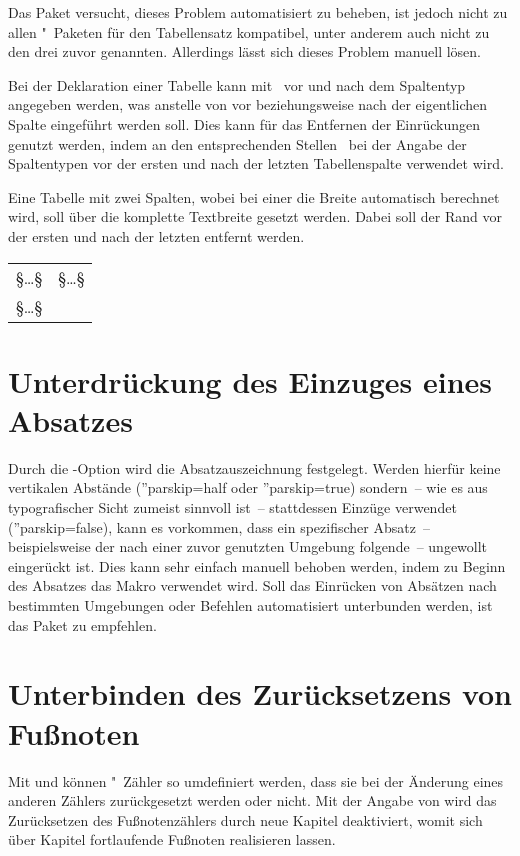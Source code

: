 Das Paket  versucht, dieses Problem automatisiert zu 
beheben, ist jedoch nicht zu allen "~Paketen für den 
Tabellensatz kompatibel, unter anderem auch nicht zu den drei zuvor genannten. 
Allerdings lässt sich dieses Problem manuell lösen. 

Bei der Deklaration einer Tabelle kann mit~\MPValue{\dots} vor und 
nach dem Spaltentyp angegeben werden, was anstelle von  vor 
beziehungsweise nach der eigentlichen Spalte eingeführt werden soll. Dies kann 
für das Entfernen der Einrückungen genutzt werden, indem an den entsprechenden 
Stellen~ bei der Angabe der Spaltentypen vor der ersten und 
nach der letzten Tabellenspalte verwendet wird.
%
\begin{Example}
Eine Tabelle mit zwei Spalten, wobei bei einer die Breite automatisch berechnet 
wird, soll über die komplette Textbreite gesetzt werden. Dabei soll der Rand 
vor der ersten und nach der letzten entfernt werden.
\begin{Code}[escapechar=§]
\begin{tabularx}{\textwidth}{@{}lX@{}}
§\dots§ & §\dots§ \tabularnewline
§\dots§
\end{tabularx}
\end{Code}
\end{Example}



\section{%
  Unterdrückung des Einzuges eines Absatzes%
}
%
Durch die \KOMAScript-Option  wird
die Absatzauszeichnung  festgelegt. Werden hierfür keine vertikalen Abstände 
(\Option''{parskip=half} oder \Option''{parskip=true}) sondern~-- wie es aus 
typografischer Sicht zumeist sinnvoll ist~-- stattdessen Einzüge verwendet 
(\Option''{parskip=false}), kann es vorkommen, dass ein spezifischer Absatz~-- 
beispielsweise der nach einer zuvor genutzten Umgebung folgende~-- ungewollt 
eingerückt ist. Dies kann sehr einfach manuell behoben werden, indem zu Beginn 
des Absatzes das Makro  verwendet wird. Soll das Einrücken von 
Absätzen nach bestimmten Umgebungen oder Befehlen automatisiert unterbunden 
werden, ist das Paket  zu empfehlen.



\section{%
  Unterbinden des Zurücksetzens von Fußnoten%
  \label{sec:tips:counter}%
}
%
Mit  und  können 
"~Zähler so umdefiniert werden, dass sie bei der Änderung eines 
anderen Zählers zurückgesetzt werden oder nicht. Mit der Angabe von 
 wird das 
Zurücksetzen des Fußnotenzählers durch neue Kapitel deaktiviert, womit sich 
über Kapitel fortlaufende Fußnoten realisieren lassen.




